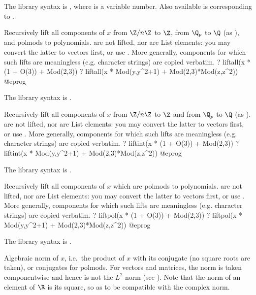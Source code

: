 The library syntax is , where  is a variable number.
Also available is  corresponding to
.

\label{se:liftall}
Recursively lift all components of $x$ from $\Z/n\Z$ to $\Z$,
from $\Q_p$ to $\Q$ (as ), and polmods to
polynomials.  are not lifted, nor are List elements: you may
convert the latter to vectors first, or use . More
generally, components for which such lifts are meaningless (e.g. character
strings) are copied verbatim.
\bprog
? liftall(x * (1 + O(3)) + Mod(2,3))
? liftall(x * Mod(y,y^2+1) + Mod(2,3)*Mod(z,z^2))
@eprog

The library syntax is .

\label{se:liftint}
Recursively lift all components of $x$ from $\Z/n\Z$ to $\Z$ and
from $\Q_p$ to $\Q$ (as ).
 are not lifted, nor are List elements: you may
convert the latter to vectors first, or use . More
generally, components for which such lifts are meaningless (e.g. character
strings) are copied verbatim.
\bprog
? liftint(x * (1 + O(3)) + Mod(2,3))
? liftint(x * Mod(y,y^2+1) + Mod(2,3)*Mod(z,z^2))
@eprog

The library syntax is .

\label{se:liftpol}
Recursively lift all components of $x$ which are polmods to
polynomials.  are not lifted, nor are List elements: you may
convert the latter to vectors first, or use . More
generally, components for which such lifts are meaningless (e.g. character
strings) are copied verbatim.
\bprog
? liftpol(x * (1 + O(3)) + Mod(2,3))
? liftpol(x * Mod(y,y^2+1) + Mod(2,3)*Mod(z,z^2))
@eprog

The library syntax is .

\label{se:norm}
Algebraic norm of $x$, i.e.~the product of $x$ with
its conjugate (no square roots are taken), or conjugates for polmods. For
vectors and matrices, the norm is taken componentwise and hence is not the
$L^2$-norm (see ). Note that the norm of an element of
$\R$ is its square, so as to be compatible with the complex norm.

